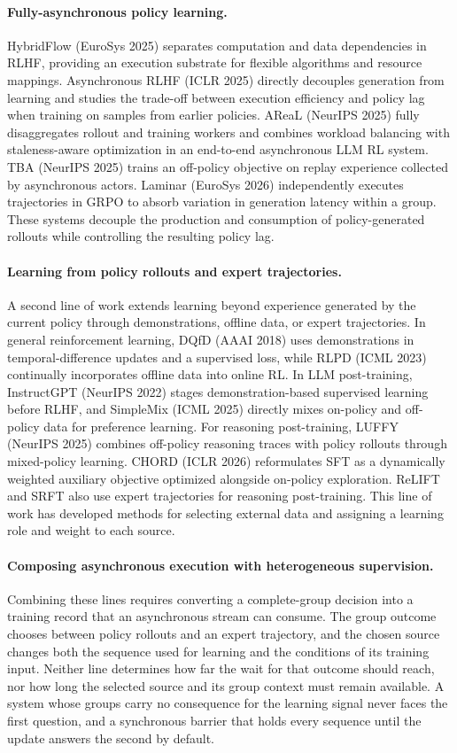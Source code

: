 \documentclass[letterpaper]{article}
\begin{document}
\paragraph{Fully-asynchronous policy learning.}
HybridFlow (EuroSys 2025) separates computation and data dependencies in RLHF, providing an execution substrate for flexible algorithms and resource mappings.
Asynchronous RLHF (ICLR 2025) directly decouples generation from learning and studies the trade-off between execution efficiency and policy lag when training on samples from earlier policies.
AReaL (NeurIPS 2025) fully disaggregates rollout and training workers and combines workload balancing with staleness-aware optimization in an end-to-end asynchronous LLM RL system.
TBA (NeurIPS 2025) trains an off-policy objective on replay experience collected by asynchronous actors.
Laminar (EuroSys 2026) independently executes trajectories in GRPO to absorb variation in generation latency within a group.
These systems decouple the production and consumption of policy-generated rollouts while controlling the resulting policy lag.

\paragraph{Learning from policy rollouts and expert trajectories.}
A second line of work extends learning beyond experience generated by the current policy through demonstrations, offline data, or expert trajectories.
In general reinforcement learning, DQfD (AAAI 2018) uses demonstrations in temporal-difference updates and a supervised loss, while RLPD (ICML 2023) continually incorporates offline data into online RL.
In LLM post-training, InstructGPT (NeurIPS 2022) stages demonstration-based supervised learning before RLHF, and SimpleMix (ICML 2025) directly mixes on-policy and off-policy data for preference learning.
For reasoning post-training, LUFFY (NeurIPS 2025) combines off-policy reasoning traces with policy rollouts through mixed-policy learning.
CHORD (ICLR 2026) reformulates SFT as a dynamically weighted auxiliary objective optimized alongside on-policy exploration.
ReLIFT and SRFT also use expert trajectories for reasoning post-training.
This line of work has developed methods for selecting external data and assigning a learning role and weight to each source.

\paragraph{Composing asynchronous execution with heterogeneous supervision.}
Combining these lines requires converting a complete-group decision into a training record that an asynchronous stream can consume.
The group outcome chooses between policy rollouts and an expert trajectory, and the chosen source changes both the sequence used for learning and the conditions of its training input.
Neither line determines how far the wait for that outcome should reach, nor how long the selected source and its group context must remain available.
A system whose groups carry no consequence for the learning signal never faces the first question, and a synchronous barrier that holds every sequence until the update answers the second by default.
\end{document}
